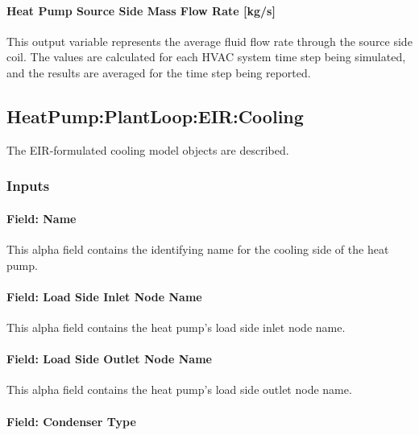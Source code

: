 \paragraph{Heat Pump Source Side Mass Flow Rate {[}kg/s{]}}\label{water-to-water-heat-pump-source-side-mass-flow-rate-kgs-1}

This output variable represents the average fluid flow rate through the source side coil. The values are calculated for each HVAC system time step being simulated, and the results are averaged for the time step being reported.


\subsection{HeatPump:PlantLoop:EIR:Cooling}\label{plhp_eir_cooling}

The EIR-formulated cooling model objects are described.

\subsubsection{Inputs}\label{plhp_eir_cooling_inputs}

\paragraph{Field: Name}\label{plhp_eir_cooling_inputs_name}

This alpha field contains the identifying name for the cooling side of the heat pump.

\paragraph{Field: Load Side Inlet Node Name}\label{plhp_eir_cooling_inputs_load_inlet_node}

This alpha field contains the heat pump's load side inlet node name.

\paragraph{Field: Load Side Outlet Node Name}\label{plhp_eir_cooling_inputs_load_outlet_node}

This alpha field contains the heat pump's load side outlet node name.

\paragraph{Field: Condenser Type}\label{plhp_eir_cooling_condenser_type}


